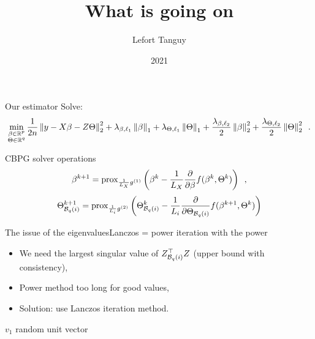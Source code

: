 \documentclass[10pt,aspectratio=43]{beamer}
\title[] %
{What is going on} %
\subtitle{}
\date{2021} %
\author[]%
{%
	{Lefort Tanguy}%
}
\institute[
]
{%
    University of Montpellier
}
\begin{document}
\maketitle

\begin{frame}{Our estimator}
Solve:
\[\min_{\substack{\beta \in \mathbb{R}^p \\ \Theta \in \mathbb{R}^q}}
\frac{1}{2 n} \left \lVert y - X\beta - Z\Theta \right \rVert^2_2 +
\lambda_{\beta, \ell_1} \left \lVert \beta \right \rVert_1 + \lambda_{\Theta, \ell_1} \left \lVert \Theta \right \rVert_1 +
\frac{\lambda_{\beta, \ell_2}}{2} \left \lVert \beta \right \rVert_2^2 + \frac{\lambda_{\Theta, \ell_2}}{2} \left \lVert \Theta \right \rVert_2^2\enspace .\]
\begin{block}{CBPG solver operations}
    \[\beta^{k+1} =  \operatorname{prox}_{\frac{1}{L_X}g^{(1)}}\left(\beta^k - \frac{1}{L_X}\frac{\partial}{\partial \beta}f(\beta^k, \Theta^k)\right)\enspace,\]
    \[ \Theta^{k+1}_{\mathcal{B}_{q}(i)}= \operatorname{prox}_{\frac{1}{L_i}g^{(2)}}\left(\Theta^k_{\mathcal{B}_{q}(i)} - \frac{1}{L_i}\frac{\partial}{\partial \Theta_{\mathcal{B}_{q}(i)}}f(\beta^{k+1}, \Theta^k)\right)\]
\end{block}
\end{frame}

\begin{frame}{The issue of the eigenvalues}{Lanczos = power iteration with the power}
    \begin{itemize}
        \item We need the largest singular value of $Z_{\mathcal{B}_{q}(i)}^\top Z$ (upper bound with consistency),
        \item Power method too long for good values,
        \item Solution: use Lanczos iteration method.
    \end{itemize}
    \begin{algorithm}[H]
        \caption{Lanczos algorithm on an hermitian matrix H}

        $v_1$ random unit vector

    \end{algorithm}
\end{frame}
\end{document}
